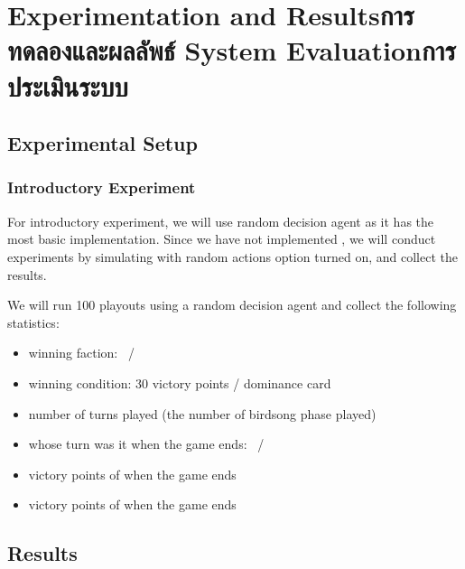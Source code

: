 \chapter{\ifproject%
\ifenglish Experimentation and Results\else การทดลองและผลลัพธ์\fi
\else%
\ifenglish System Evaluation\else การประเมินระบบ\fi
\fi}


\section{Experimental Setup}

\subsection{Introductory Experiment}
For introductory experiment, we will use random decision agent as it has the most basic implementation. Since we have not implemented \RootAI, we will conduct experiments by simulating \RootOurs with random actions option turned on, and collect the results. 

We will run 100 \glspl{playout} using a random decision agent and collect the following statistics:
\begin{itemize}
    \item winning faction: \Marquise \ / \Eyrie
    \item winning condition: 30 victory points / dominance card
    \item number of turns played (the number of birdsong phase played)
    \item whose turn was it when the game ends: \Marquise \ / \Eyrie
    \item victory points of \Marquise when the game ends
    \item victory points of \Eyrie when the game ends
\end{itemize}


\section{Results}